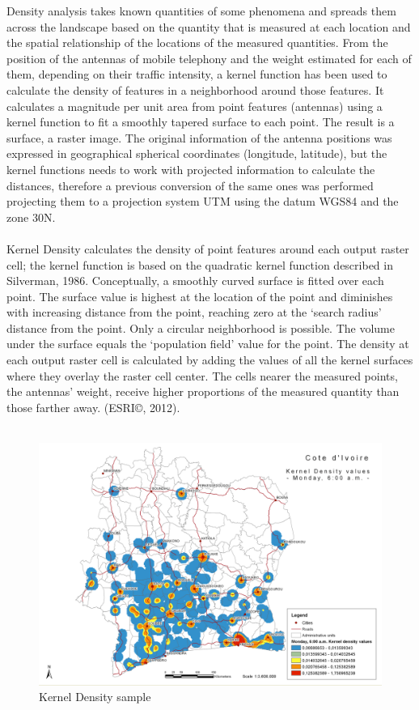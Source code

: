 \newpage
Density analysis takes known quantities of some phenomena and spreads them across the landscape based on the quantity that is measured at each location and the spatial relationship of the locations of the measured quantities. From the position of the antennas of mobile telephony and the weight estimated for each of them, depending on their traffic intensity, a kernel function has been used to calculate the density of features in a neighborhood around those features. It calculates a magnitude per unit area from point features (antennas) using a kernel function to fit a smoothly tapered surface to each point. The result is a surface, a raster image. The original information of the antenna positions was expressed in geographical spherical coordinates (longitude, latitude), but the kernel functions needs to work with  projected information to calculate the distances, therefore a previous conversion of the same ones was performed projecting them to a projection system UTM using the datum WGS84 and the zone 30N.
\\
\\
Kernel Density calculates the density of point features around each output raster cell; the kernel function is based on the quadratic kernel function described in Silverman, 1986. Conceptually, a smoothly curved surface is fitted over each point. The surface value is highest at the location of the point and diminishes with increasing distance from the point, reaching zero at the ‘search radius’ distance from the point. Only a circular neighborhood is possible. The volume under the surface equals the ‘population field’ value for the point. The density at each output raster cell is calculated by adding the values of all the kernel surfaces where they overlay the raster cell center. The cells nearer the measured points, the antennas' weight, receive higher proportions of the measured quantity than those farther away. (ESRI©, 2012).
\\
\\
\begin{figure}[h]
\begin{center}
\includegraphics[scale = 0.43] {results/images/kernel/L_hour6_kd_Map.pdf}
\caption{Kernel Density sample}
\label{fig:ks_sample}
\end{center}
\end{figure}



